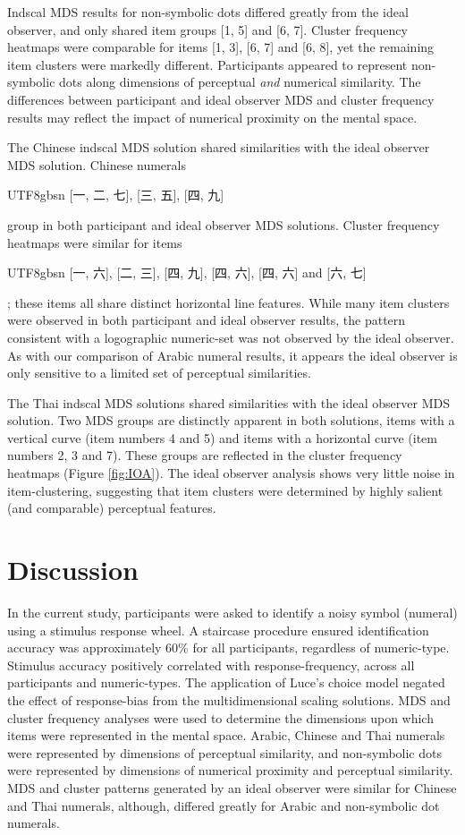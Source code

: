 Indscal MDS results for non-symbolic dots differed greatly from the ideal observer, and only shared item groups [1, 5] and [6, 7]. Cluster frequency heatmaps were comparable for items [1, 3], [6, 7] and [6, 8], yet the remaining item clusters were markedly different. Participants appeared to represent non-symbolic dots along dimensions of perceptual \textit{and} numerical similarity. The differences between participant and ideal observer MDS and cluster frequency results may reflect the impact of numerical proximity on the mental space. 

The Chinese indscal MDS solution shared similarities with the ideal observer MDS solution. Chinese numerals \begin{CJK}{UTF8}{gbsn} [一, 二, 七], [三, 五], [四, 九] \end{CJK} group in both participant and ideal observer MDS solutions. Cluster frequency heatmaps were similar for items \begin{CJK}{UTF8}{gbsn} [一, 六], [二, 三], [四, 九], [四, 六], [四, 六] and [六, 七] \end{CJK}; these items all share distinct horizontal line features. While many item clusters were observed in both participant and ideal observer results, the pattern consistent with a logographic numeric-set was not observed by the ideal observer. As with our comparison of Arabic numeral results, it appears the ideal observer is only sensitive to a limited set of perceptual similarities.

The Thai indscal MDS solutions shared similarities with the ideal observer MDS solution. Two MDS groups are distinctly apparent in both solutions, items with a vertical curve (item numbers 4 and 5) and items with a horizontal curve (item numbers 2, 3 and 7). These groups are reflected in the cluster frequency heatmaps (Figure \ref{fig:IOA}). The ideal observer analysis shows very little noise in item-clustering, suggesting that item clusters were determined by highly salient (and comparable) perceptual features. 

\section{Discussion}
In the current study, participants were asked to identify a noisy symbol (numeral) using a stimulus response wheel. A staircase procedure ensured identification accuracy was approximately 60\% for all participants, regardless of numeric-type. Stimulus accuracy positively correlated with response-frequency, across all participants and numeric-types. The application of Luce's choice model negated the effect of response-bias from the multidimensional scaling solutions. MDS and cluster frequency analyses were used to determine the dimensions upon which items were represented in the mental space. Arabic, Chinese and Thai numerals were represented by dimensions of perceptual similarity, and non-symbolic dots were represented by dimensions of numerical proximity and perceptual similarity. MDS and cluster patterns generated by an ideal observer were similar for Chinese and Thai numerals, although, differed greatly for Arabic and non-symbolic dot numerals.

